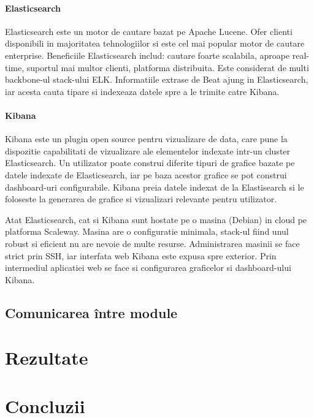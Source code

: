 \documentclass[12pt]{report}
\begin{document}
			\subsubsection{Elasticsearch}
Elasticsearch este un motor de cautare bazat pe Apache Lucene. Ofer clienti disponibili in majoritatea tehnologiilor si este cel mai popular motor de cautare enterprise. Beneficiile Elasticsearch includ: cautare foarte scalabila, aproape real-time, suportul mai multor clienti, platforma distribuita. Este considerat de multi backbone-ul stack-ului ELK. Informatiile extrase de Beat ajung in Elasticsearch, iar acesta cauta tipare si indexeaza datele spre a le trimite catre Kibana.


			\subsubsection{Kibana}
Kibana este un plugin open source pentru vizualizare de data, care pune la dispozitie capabilitati de vizualizare ale elementelor indexate intr-un cluster Elasticsearch. Un utilizator poate  construi diferite tipuri de grafice bazate pe datele indexate de Elasticsearch, iar pe baza acestor grafice se pot construi dashboard-uri configurabile. Kibana preia datele indexat de la Elastisearch si le foloseste la generarea de grafice si vizualizari relevante pentru utilizator.

Atat Elasticsearch, cat si Kibana sunt hostate pe o masina (Debian) in cloud pe platforma Scaleway. Masina are o configuratie minimala, stack-ul fiind unul robust si eficient nu are nevoie de multe resurse. Administrarea masinii se face strict prin SSH, iar interfata web Kibana este expusa spre exterior. Prin intermediul aplicatiei web se face si configurarea graficelor si dashboard-ului Kibana.
	\section{Comunicarea între module}

\chapter{Rezultate}

\chapter{Concluzii}
\end{document}
